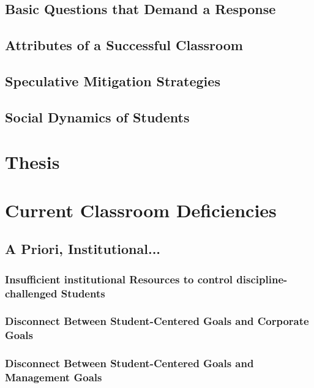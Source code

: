 \documentclass[12pt]{article}
\begin{document}
	\subsection{Basic Questions that Demand a Response}
	\subsection{Attributes of a Successful Classroom}
	\subsection{Speculative Mitigation Strategies}
	\subsection{Social Dynamics of Students}
	
	\section{Thesis}
	
	\section{Current Classroom Deficiencies}
	
	\subsection{A Priori, Institutional...}
	\subsubsection{Insufficient institutional Resources to control discipline-challenged Students}
	\subsubsection{Disconnect Between Student-Centered Goals and Corporate Goals}
	\subsubsection{Disconnect Between Student-Centered Goals and Management Goals}
\end{document}
